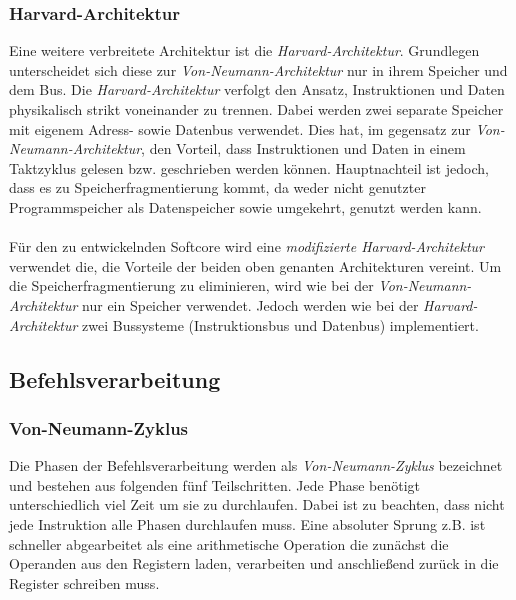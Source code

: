                 \subsubsection{Harvard-Architektur}
                    Eine weitere verbreitete Architektur ist die \textit{Harvard-Architektur}.
                    Grundlegen unterscheidet sich diese zur \textit{Von-Neumann-Architektur}
                    nur in ihrem Speicher und dem Bus. Die \textit{Harvard-Architektur} verfolgt den Ansatz,
                    Instruktionen und Daten physikalisch strikt voneinander zu trennen.
                    Dabei werden zwei separate Speicher mit eigenem Adress- sowie Datenbus verwendet.
                    Dies hat, im gegensatz zur \textit{Von-Neumann-Architektur}, den Vorteil, dass Instruktionen
                    und Daten in einem Taktzyklus gelesen bzw. geschrieben werden können. Hauptnachteil ist jedoch,
                    dass es zu Speicherfragmentierung kommt, da weder nicht genutzter Programmspeicher als Datenspeicher
                    sowie umgekehrt, genutzt werden kann.
                    \\\\
                    Für den zu entwickelnden Softcore wird eine \textit{modifizierte Harvard-Architektur} verwendet die,
                    die Vorteile der beiden oben genanten Architekturen vereint. Um die Speicherfragmentierung zu eliminieren, 
                    wird wie bei der \textit{Von-Neumann-Architektur} nur ein Speicher verwendet.
                    Jedoch werden wie bei der \textit{Harvard-Architektur} zwei Bussysteme (Instruktionsbus und Datenbus)
                    implementiert. 

        \subsection{Befehlsverarbeitung}

            \subsubsection{Von-Neumann-Zyklus}
                Die Phasen der Befehlsverarbeitung werden als \textit{Von-Neumann-Zyklus}
                bezeichnet und bestehen aus folgenden fünf Teilschritten.
                Jede Phase benötigt unterschiedlich viel Zeit um sie zu durchlaufen.
                Dabei ist zu beachten, dass nicht jede Instruktion alle Phasen durchlaufen muss.
                Eine absoluter Sprung z.B. ist schneller abgearbeitet als eine arithmetische
                Operation die zunächst die Operanden aus den Registern laden,
                verarbeiten und anschließend zurück in die Register schreiben muss.
            
